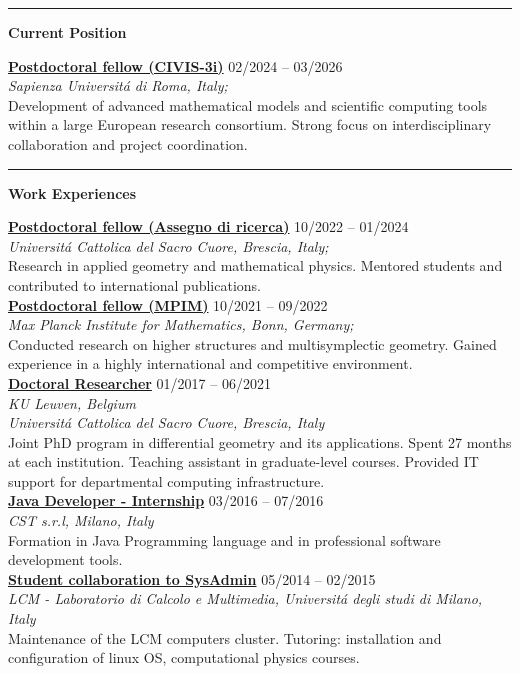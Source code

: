 \documentclass[a4paper]{article}
\newcommand{\block}[1]{\hrule \vspace{0.2cm} \textbf{\Large #1} \vspace{0.2cm}}
\newcommand{\voice}[5]{\href{#4}{\textbf{#1}} \hfill #2 \\ \textit{#3} \\ {\small #5} \vspace{0.2cm} \\}
\begin{document}
\begin{minipage}[t]{0.6\columnwidth}

	\block{Current Position}

    	\voice{Postdoctoral fellow (CIVIS-3i)}
			{02/2024 -- 03/2026}
			{Sapienza Universit\'a di Roma, Italy;}
			{https://civis3i.univ-amu.fr/en/civis3i-alliance-programme}       
			{Development of advanced mathematical models and scientific computing tools within a large European research consortium. Strong focus on interdisciplinary collaboration and project coordination.}

    \block{Work Experiences}

	\voice{Postdoctoral fellow (Assegno di ricerca)}
		{10/2022 -- 01/2024}
		{Universit\'a Cattolica del Sacro Cuore, Brescia, Italy;}
		{https://dipartimenti.unicatt.it/dmf-home}       
		{Research in applied geometry and mathematical physics. Mentored students and contributed to international publications.}
	\voice{Postdoctoral fellow (MPIM)}
		{10/2021 -- 09/2022}
		{Max Planck Institute for Mathematics, Bonn, Germany;}
		{https://www.mpim-bonn.mpg.de/}       
		 {Conducted research on higher structures and multisymplectic geometry. Gained experience in a highly international and competitive environment.}
        \voice{Doctoral Researcher}
    	{01/2017 -- 06/2021}
    	{KU Leuven, Belgium \\ Universit\'a Cattolica del Sacro Cuore, Brescia, Italy }
    	{https://scuoledidottorato.unicatt.it/phdschools/science-10574.html}
    	{Joint PhD program in differential geometry and its applications. Spent 27 months at each institution.
        Teaching assistant in graduate-level courses. Provided IT support for departmental computing infrastructure.}	
    \voice{Java Developer - Internship}
        {03/2016  -- 07/2016}
        {CST s.r.l, Milano, Italy}
        {https://www.csttech.it/}       
        {Formation in Java Programming language and in professional software development tools.}
    \voice{Student collaboration to SysAdmin}
        {05/2014 -- 02/2015}
        {LCM - Laboratorio di Calcolo e Multimedia, Universit\'a degli studi di Milano, Italy}
        {https://lcm.mi.infn.it/}       
        {Maintenance of the LCM computers cluster. Tutoring: installation and configuration of linux OS, computational physics courses.\vspace{-0.25cm}}
 



















\end{minipage} 
\end{document}
